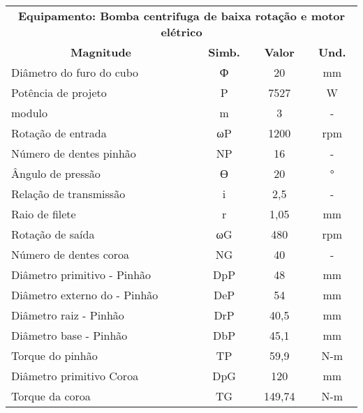 \begin{table}[]
\begin{tabular}{lccc}
\multicolumn{4}{c}{\textbf{Equipamento: Bomba centrifuga de baixa rotação e motor elétrico}} \\
\multicolumn{1}{c}{\textbf{Magnitude}}  & \textbf{Simb.}  & \textbf{Valor}  & \textbf{Und.}  \\
Diâmetro do furo do cubo                & Ф               & 20              & mm             \\
Potência de projeto                     & P               & 7527            & W              \\
modulo                                  & m               & 3               & -              \\
Rotação de entrada                      & ωP              & 1200            & rpm            \\
Número de dentes pinhão                 & NP              & 16              & -              \\
Ângulo de pressão                       & ϴ               & 20              & °              \\
Relação de transmissão                  & i               & 2,5             & -              \\
Raio de filete                          & r               & 1,05            & mm             \\
Rotação de saída                        & ωG              & 480             & rpm            \\
Número de dentes coroa                  & NG              & 40              & -              \\
Diâmetro primitivo - Pinhão             & DpP             & 48              & mm             \\
Diâmetro externo do - Pinhão            & DeP             & 54              & mm             \\
Diâmetro raiz - Pinhão                  & DrP             & 40,5            & mm             \\
Diâmetro base - Pinhão                  & DbP             & 45,1            & mm             \\
Torque do pinhão                        & TP              & 59,9            & N-m            \\
Diâmetro primitivo Coroa                & DpG             & 120             & mm             \\
Torque da coroa                         & TG              & 149,74          & N-m            \\

\end{tabular}
\end{table}
